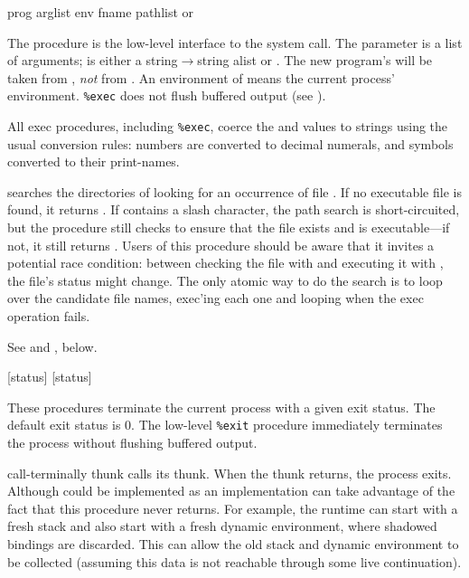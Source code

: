  {prog arglist env} \undefined
{} {fname pathlist} {{\str} or \sharpf}
\begin{desc}
The  procedure is the low-level interface to the system call.
The  parameter is a list of arguments; 
 is either a string$\rightarrow$string alist or {\sharpt}.  
The new program's  will be taken from ,
\emph{not} from .
An environment of {\sharpt} means the current process' environment. 
\verb|%exec| does not flush buffered output
(see ).

All exec procedures, including \verb|%exec|, coerce the  and 
values to strings using the usual conversion rules: numbers are converted to
decimal numerals, and symbols converted to their print-names.

 searches the directories of  looking for
an occurrence of file . If no executable file is found, it returns
{\sharpf}. If  contains a slash character, the path search is
short-circuited, but the procedure still checks to ensure that the file exists
and is executable---if not, it still returns {\sharpf}.
Users of this procedure should be aware that it invites a potential race 
condition: between checking the file with  and executing
it with , the file's status might change.
The only atomic way to do the search is to loop over the candidate
file names, exec'ing each one and looping when the exec operation fails.

See  and , below.
\end{desc}

 {[status]} \noreturn
{} {[status]} \noreturn
\begin{desc}
These procedures terminate the current process with a given exit status.
The default exit status is 0.
The low-level \verb|%exit| procedure immediately terminates the process
without flushing buffered output.
\end{desc}

\begin{defundesc} {call-terminally} {thunk} \noreturn
     calls its thunk. When the thunk returns, the process
    exits.  Although  could be implemented as
    an implementation can take advantage of the fact that this procedure never
    returns. For example, the runtime can start with a fresh stack and also
    start with a fresh dynamic environment, where shadowed bindings are
    discarded. This can allow the old stack and dynamic environment to be
    collected (assuming this data is not reachable through some live
    continuation).
\end{defundesc}

